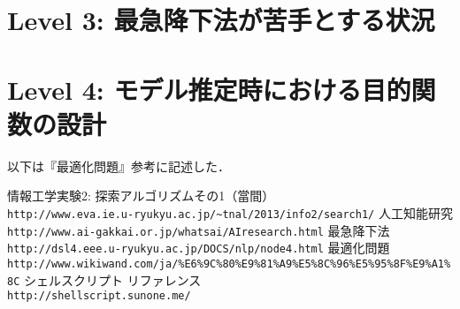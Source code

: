 \documentclass[10pt]{jarticle}
\begin{document}
\newpage

\section{Level 3: 最急降下法が苦手とする状況}


\newpage

\section{Level 4: モデル推定時における目的関数の設計}
以下は『最適化問題\cite{level401}』参考に記述した．




\vspace{+1.0cm}
\begin{thebibliography}{99}
情報工学実験2: 探索アルゴリズムその1（當間）\\
\verb|http://www.eva.ie.u-ryukyu.ac.jp/~tnal/2013/info2/search1/|
人工知能研究\\
\verb|http://www.ai-gakkai.or.jp/whatsai/AIresearch.html|
最急降下法\\
\verb|http://dsl4.eee.u-ryukyu.ac.jp/DOCS/nlp/node4.html|
最適化問題\\
\verb|http://www.wikiwand.com/ja/%E6%9C%80%E9%81%A9%E5%8C%96%E5%95%8F%E9%A1%8C|
シェルスクリプト リファレンス\\
\verb|http://shellscript.sunone.me/|

\end{thebibliography}
\end{document}
